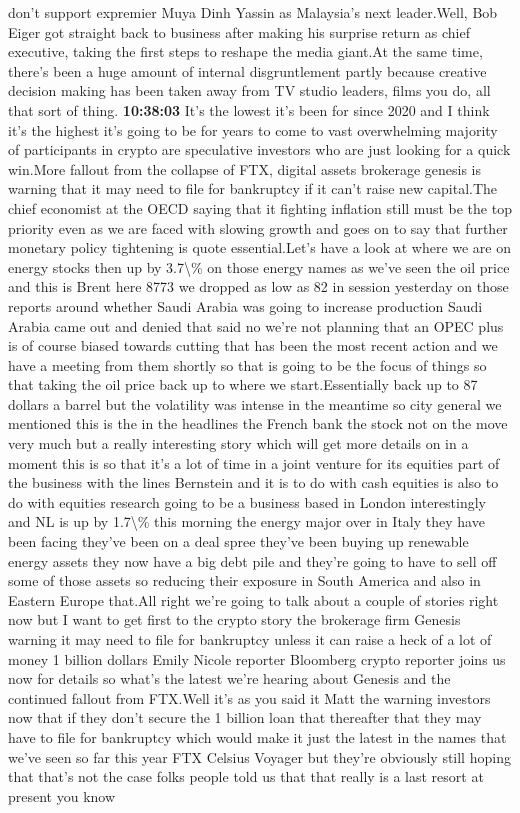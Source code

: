 \documentclass{article}%
\begin{document}
don't support expremier Muya Dinh Yassin as Malaysia's next leader.Well, Bob Eiger got straight back to business after making his surprise return as chief executive, taking the first steps to reshape the media giant.At the same time, there's been a huge amount of internal disgruntlement partly because creative decision making has been taken away from TV studio leaders, films you do, all that sort of thing.%
\textbf{10:38:03}%
\newline%
It's the lowest it's been for since 2020 and I think it's the highest it's going to be for years to come to vast overwhelming majority of participants in crypto are speculative investors who are just looking for a quick win.More fallout from the collapse of FTX, digital assets brokerage genesis is warning that it may need to file for bankruptcy if it can't raise new capital.The chief economist at the OECD saying that it fighting inflation still must be the top priority even as we are faced with slowing growth and goes on to say that further monetary policy tightening is quote essential.Let's have a look at where we are on energy stocks then up by 3.7\textbackslash{}\% on those energy names as we've seen the oil price and this is Brent here 8773 we dropped as low as 82 in session yesterday on those reports around whether Saudi Arabia was going to increase production Saudi Arabia came out and denied that said no we're not planning that an OPEC plus is of course biased towards cutting that has been the most recent action and we have a meeting from them shortly so that is going to be the focus of things so that taking the oil price back up to where we start.Essentially back up to 87 dollars a barrel but the volatility was intense in the meantime so city general we mentioned this is the in the headlines the French bank the stock not on the move very much but a really interesting story which will get more details on in a moment this is so that it's a lot of time in a joint venture for its equities part of the business with the lines Bernstein and it is to do with cash equities is also to do with equities research going to be a business based in London interestingly and NL is up by 1.7\textbackslash{}\% this morning the energy major over in Italy they have been facing they've been on a deal spree they've been buying up renewable energy assets they now have a big debt pile and they're going to have to sell off some of those assets so reducing their exposure in South America and also in Eastern Europe that.All right we're going to talk about a couple of stories right now but I want to get first to the crypto story the brokerage firm Genesis warning it may need to file for bankruptcy unless it can raise a heck of a lot of money 1 billion dollars Emily Nicole reporter Bloomberg crypto reporter joins us now for details so what's the latest we're hearing about Genesis and the continued fallout from FTX.Well it's as you said it Matt the warning investors now that if they don't secure the 1 billion loan that thereafter that they may have to file for bankruptcy which would make it just the latest in the names that we've seen so far this year FTX Celsius Voyager but they're obviously still hoping that that's not the case folks people told us that that really is a last resort at present you know 
\end{document}
